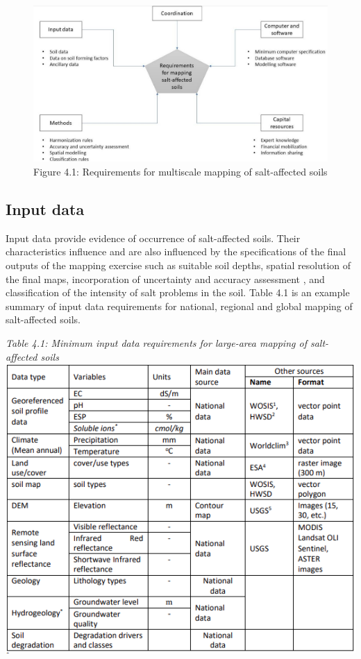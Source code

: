 \documentclass[
  10pt,
  b5paper,
]{book}
\begin{document}
\begin{figure}
\centering
\includegraphics{figures/images/Figure4.1.jpg}
\caption{Figure 4.1: Requirements for multiscale mapping of salt-affected soils}
\end{figure}

\hypertarget{input-data}{%
\subsection{Input data}\label{input-data}}

Input data provide evidence of occurrence of salt-affected soils. Their characteristics influence and are also influenced by the specifications of the final outputs of the mapping exercise such as suitable soil depths, spatial resolution of the final maps, incorporation of uncertainty and accuracy assessment , and classification of the intensity of salt problems in the soil. Table 4.1 is an example summary of input data requirements for national, regional and global mapping of salt-affected soils.

\emph{Table 4.1: Minimum input data requirements for large-area mapping of salt-affected soils}
\includegraphics{figures/tables/Table_4.1.PNG}
\end{document}
